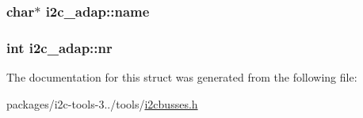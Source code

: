 \subsubsection[{name}]{\setlength{\rightskip}{0pt plus 5cm}char$\ast$ i2c\+\_\+adap\+::name}\label{structi2c__adap_a70e3d02d26daacc6adf10cd026a7e2ee}
\hypertarget{structi2c__adap_addd7cc4b8e16049cdf030d00d4568477}{}
\subsubsection[{nr}]{\setlength{\rightskip}{0pt plus 5cm}int i2c\+\_\+adap\+::nr}\label{structi2c__adap_addd7cc4b8e16049cdf030d00d4568477}


The documentation for this struct was generated from the following file\+:\begin{DoxyCompactItemize}
\item 
packages/i2c-\/tools-\/3../tools/\hyperlink{i2cbusses_8h}{i2cbusses.\+h}\end{DoxyCompactItemize}
